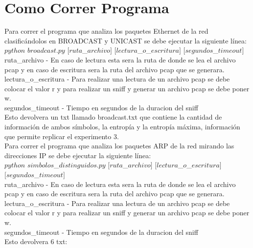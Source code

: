 \section{Como Correr Programa}

Para correr el programa que analiza los paquetes Ethernet de la red clasificándolos en BROADCAST y UNICAST se debe ejecutar la siguiente línea:\\

$python$ $broadcast.py$ $[ruta$_$archivo]$ $[lectura$_$o$_$escritura]$ $[segundos$_$timeout]$ \\

ruta_archivo - En caso de lectura esta sera la ruta de donde se lea el archivo pcap y en caso de escritura sera la ruta del archivo pcap que se generara.\\
lectura_o_escritura - Para realizar una lectura de un archivo pcap se debe colocar el valor r y para realizar un sniff y generar un archivo pcap se debe poner w.\\
segundos_timeout - Tiempo en segundos de la duracion del sniff\\

Esto devolvera un txt llamado broadcast.txt que contiene la cantidad de información de ambos símbolos, la entropía y la entropía máxima, información que permite replicar el experimento 3.
\\
Para correr el programa que analiza los paquetes ARP de la red mirando las direcciones IP se debe ejecutar la siguiente línea:\\

$python$ $simbolos$_$distinguidos.py$ $[ruta$_$archivo]$ $[lectura$_$o$_$escritura]$ $[segundos$_$timeout]$ \\

ruta_archivo - En caso de lectura esta sera la ruta de donde se lea el archivo pcap y en caso de escritura sera la ruta del archivo pcap que se generara.\\
lectura_o_escritura - Para realizar una lectura de un archivo pcap se debe colocar el valor r y para realizar un sniff y generar un archivo pcap se debe poner w.\\
segundos_timeout - Tiempo en segundos de la duracion del sniff\\

Esto devolvera 6 txt:

